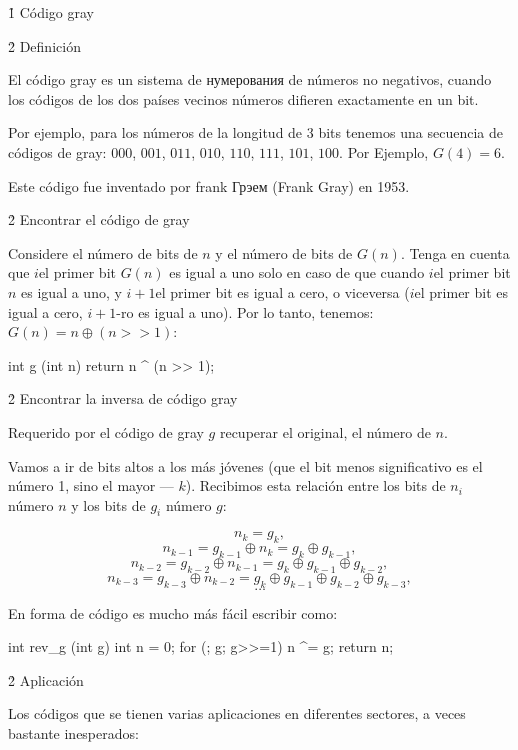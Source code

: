 \h1{ Código gray }


\h2{ Definición }

El código gray es un sistema de нумерования de números no negativos, cuando los códigos de los dos países vecinos números difieren exactamente en un bit.

Por ejemplo, para los números de la longitud de 3 bits tenemos una secuencia de códigos de gray: $000$, $001$, $011$, $010$, $110$, $111$, $101$, $100$. Por Ejemplo, $G(4)=6$.

Este código fue inventado por frank Грэем (Frank Gray) en 1953.


\h2{ Encontrar el código de gray }

Considere el número de bits de $n$ y el número de bits de $G(n)$. Tenga en cuenta que $i$el primer bit $G(n)$ es igual a uno solo en caso de que cuando $i$el primer bit $n$ es igual a uno, y $i+1$el primer bit es igual a cero, o viceversa ($i$el primer bit es igual a cero, $i+1$-ro es igual a uno). Por lo tanto, tenemos: $G(n) = n \oplus (n>>1)$:

\code
int g (int n) {
return n ^ (n >> 1);
}
\endcode


\h2{ Encontrar la inversa de código gray }

Requerido por el código de gray $g$ recuperar el original, el número de $n$.

Vamos a ir de bits altos a los más jóvenes (que el bit menos significativo es el número 1, sino el mayor --- $k$). Recibimos esta relación entre los bits de $n_i$ número $n$ y los bits de $g_i$ número $g$:

$$ n_k = g_k, $$
$$ n_{k-1} = g_{k-1} \oplus n_k = g_k \oplus g_{k-1}, $$
$$ n_{k-2} = g_{k-2} \oplus n_{k-1} = g_k \oplus g_{k-1} \oplus g_{k-2}, $$
$$ n_{k-3} = g_{k-3} \oplus n_{k-2} = g_k \oplus g_{k-1} \oplus g_{k-2} \oplus g_{k-3}, $$
$$ \ldots $$

En forma de código es mucho más fácil escribir como:

\code
int rev_g (int g) {
int n = 0;
for (; g; g>>=1)
n ^= g;
return n;
}
\endcode


\h2{ Aplicación }

Los códigos que se tienen varias aplicaciones en diferentes sectores, a veces bastante inesperados:


